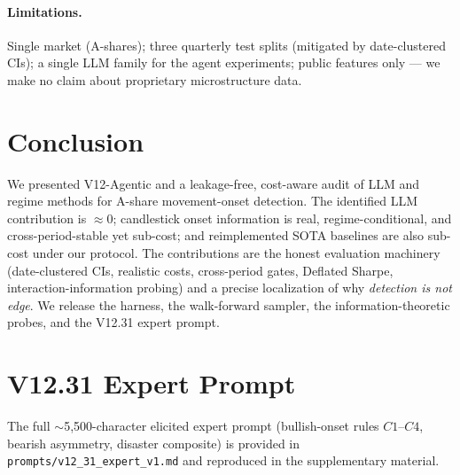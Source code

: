 \documentclass[sigconf,nonacm]{acmart}
\newcommand{\mt}[1]{\texttt{#1}}
\begin{document}
\paragraph{Limitations.} Single market (A-shares); three quarterly test splits
(mitigated by date-clustered CIs); a single LLM family for the agent experiments;
public features only --- we make no claim about proprietary microstructure data.

\section{Conclusion}\label{sec:concl}

We presented V12-Agentic and a leakage-free, cost-aware audit of LLM and regime methods
for A-share movement-onset detection. The identified LLM contribution is $\approx 0$;
candlestick onset information is real, regime-conditional, and cross-period-stable yet
sub-cost; and reimplemented SOTA baselines are also sub-cost under our protocol. The
contributions are the honest evaluation machinery (date-clustered CIs, realistic costs,
cross-period gates, Deflated Sharpe, interaction-information probing) and a precise
localization of why \emph{detection is not edge}. We release the harness, the
walk-forward sampler, the information-theoretic probes, and the V12.31 expert prompt.




\appendix
\section{V12.31 Expert Prompt}
The full $\sim$5{,}500-character elicited expert prompt (bullish-onset rules
$C1$--$C4$, bearish asymmetry, disaster composite) is provided in
\mt{prompts/v12\_31\_expert\_v1.md} and reproduced in the supplementary material.
\end{document}
